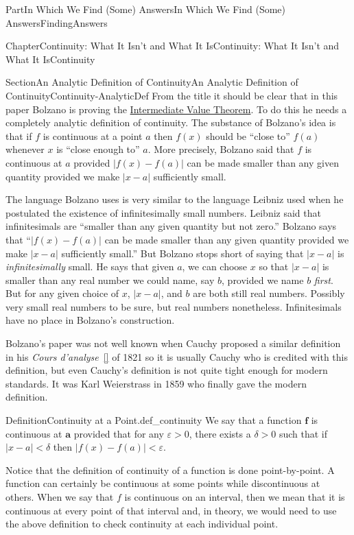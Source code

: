 \documentclass[oneside,10pt,]{book}
\newcommand{\xreffont}{\relax}
\numberwithin{equation}{part}
\newcommand{\abs}[1]{\left|#1\right|}
\newcommand{\eps}{\varepsilon}
\newcommand{\lt}{<}
\begin{document}
\begin{partptx}{Part}{In Which We Find (Some) Answers}{}{In Which We Find (Some) Answers}{}{}{FindingAnswers}
\begin{chapterptx}{Chapter}{Continuity: What It Isn't and What It Is}{}{Continuity: What It Isn't and What It Is}{}{}{Continuity}
\begin{sectionptx}{Section}{An Analytic Definition of Continuity}{}{An Analytic Definition of Continuity}{}{}{Continuity-AnalyticDef}
From the title it should be clear that in this paper Bolzano is proving the \hyperref[IntermediateValueTheorem]{Intermediate Value Theorem}.  To do this he needs a completely analytic definition of continuity.  The substance of Bolzano's idea is that if \(f\) is continuous at a point \(a\) then \(f(x)\) should be ``close to'' \(f(a)\) whenever \(x\) is ``close enough to'' \(a\).  More precisely, Bolzano said that \(f\) is continuous at \(a\) provided \(\abs{f(x)-f(a)}\) can be made smaller than any given quantity provided we make \(\abs{x-a}\) sufficiently small.%
\par
The language Bolzano uses is very similar to the language Leibniz  used when he postulated the existence of infinitesimally small numbers. Leibniz said that infinitesimals are ``smaller than any given quantity but not zero.'' Bolzano says that ``\(\abs{f(x)-f(a)}\) can be made smaller than any given quantity provided we make \(\abs{x-a}\) sufficiently small.'' But Bolzano stops short of saying that \(\abs{x-a}\) is \emph{infinitesimally} small. He says that given \(a\), we can choose \(x\) so that \(\abs{x-a}\) is smaller than any real number we could name, say \(b\), provided we name \(b\) \emph{first}. But for any given choice of \(x\), \(\abs{x-a}\), and \(b\) are both still real numbers.  Possibly very small real numbers to be sure, but real numbers nonetheless.  Infinitesimals have no place in Bolzano's construction.%
\par
{} Bolzano's paper was not well known when Cauchy  proposed a similar definition in his \emph{Cours d'analyse}~\hyperlink{bradley09__cauch_cours}{[{\xreffont 1}]} of 1821 so it is usually Cauchy who is credited with this definition, but even Cauchy's definition is not quite tight enough for modern standards.  It was Karl Weierstrass in 1859 who finally gave the modern definition.%
\begin{definition}{Definition}{Continuity at a Point.}{def_continuity}%
 We say that a function \(\boldsymbol{f}\) is continuous at \(\boldsymbol{a}\) provided that for any \(\eps>0\), there exists a \(\delta>0\) such that if \(\abs{x-a}\lt
\delta\) then \(|f(x)-f(a)|\lt \eps\).%
\end{definition}
Notice that the definition of continuity of a function is done point-by-point.  A function can certainly be continuous at some points while discontinuous at others.  When we say that \(f\) is continuous on an interval, then we mean that it is continuous at every point of that interval and, in theory, we would need to use the above definition to check continuity at each individual point.%

\end{sectionptx}
\end{chapterptx}
\end{partptx}
\end{document}
